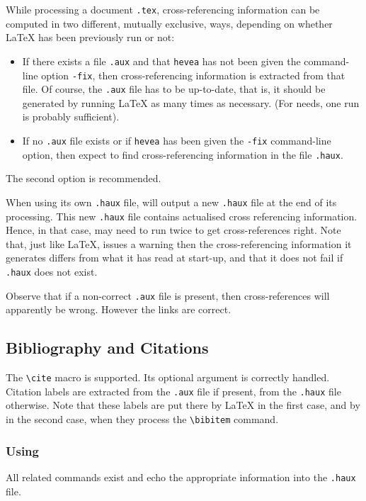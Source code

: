 While processing a document \texttt{.tex},
cross-referencing information can be computed in two different, mutually
exclusive, ways, depending
on whether \LaTeX{} has been previously run or not:
\begin{itemize}
\item If there exists a file 
\texttt{.aux} and that \texttt{hevea} has not been
given the command-line option \texttt{-fix},
then cross-referencing information is extracted
from that file. Of course, the \texttt{.aux} file
has to be up-to-date, that is,
it should be generated by running \LaTeX{} as many times as necessary.
(For \hevea{} needs, one run is probably sufficient).
\item If no \texttt{.aux} file exists or if \texttt{hevea}
has been given the \texttt{-fix} command-line option, then \hevea{}
expect to find cross-referencing information in the file
\texttt{.haux}.
\end{itemize}
The second option is recommended.

When using its own \texttt{.haux} file,
\hevea{} will output a
new \texttt{.haux} file at the end of its processing.
This new  \texttt{.haux} file contains actualised
cross referencing information.
Hence, in that case, \hevea{} may need to run twice to get
cross-references right.
Note that, just like \LaTeX,
\hevea{} issues a warning then the cross-referencing information it
generates differs from what it has read at start-up, and that it does
not fail if \texttt{.haux} does not exist.


Observe that if a non-correct \texttt{.aux} file is
present, then cross-references will apparently be wrong. However the
links are correct.


\subsection{Bibliography and Citations}
The \verb+\cite+ macro is supported. Its optional argument is
correctly handled. Citation labels  are extracted from the
\texttt{.aux} file if present, from the \texttt{.haux} file otherwise.
Note that these labels are put there by \LaTeX{} in the first case,
and by \hevea{} in the second case, when they process the
\verb+\bibitem+ command.

\subsubsection*{Using \BibTeX}
All \BibTeX{} related commands exist and echo the appropriate
information into the \texttt{.haux} file.

